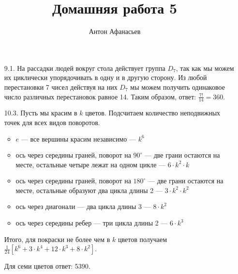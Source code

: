 \documentclass[10pt]{article}
\begin{document}
\title{Домашняя работа 5}
\author{Антон Афанасьев}
\maketitle

\begin{enumerate}
	\item[9.1.] На рассадки людей вокруг стола действует группа $D_7$, так как мы можем их циклически упорядочивать в одну и в другую сторону. Из любой перестановки 7 чисел действуя на них $D_7$ мы можем получить одинаковое число различных перестановок равное 14. Таким образом, ответ: $\frac{7!}{14} = 360$.
	
	\item[10.3.] Пусть мы красим в $k$ цветов. Подсчитаем количество неподвижных точек для всех видов поворотов.
	\begin{itemize}
		\item $e$ --- все вершины красим независимо --- $k^6$
		\item ось через середины граней, поворот на $90^\circ$ --- две грани остаются на месте, остальные четыре лежат на одном цикле --- $6 \cdot k^2 \cdot k$
		\item ось через середины граней, поворот на $180^\circ$ --- две грани остаются на месте, остальные образуют два цикла длины 2 --- $3 \cdot k^2 \cdot k^2$
		\item ось через диагонали --- два цикла длины 3 --- $8 \cdot k^2$
		\item ось через середины ребер --- три цикла длины 2 --- $6 \cdot k^3$
	\end{itemize}
	
	Итого, для покраски не более чем в $k$ цветов получаем $\frac{1}{24} \left [  k^6 + 3 \cdot k^4 + 12 \cdot k^3 + 8 \cdot k^2 \right]$.
	
	Для семи цветов ответ: 5390.
	
\end{enumerate}
\end{document}
